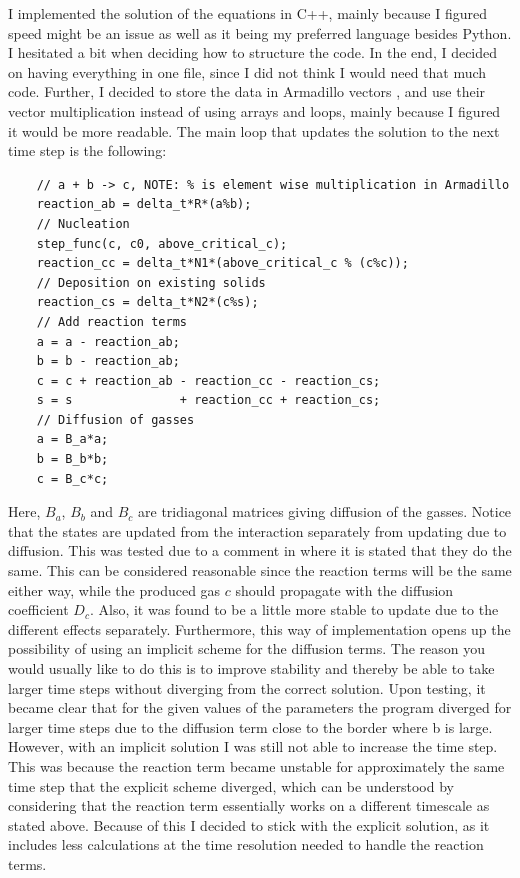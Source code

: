 \documentclass[1p]{elsarticle}        	%
\begin{document}
I implemented the solution of the equations in C++, mainly because I figured speed might be an issue as well as it being my preferred language besides Python. 
I hesitated a bit when deciding how to structure the code. In the end, I decided on having everything in one file, since I did not think I would need that much code. 
Further, I decided to store the data in Armadillo vectors  \cite{armadillo}, and use their vector multiplication instead of using arrays and loops, mainly because I figured it would be more readable. 
The main loop that updates the solution to the next time step is the following:
\begin{lstlisting}
    // a + b -> c, NOTE: % is element wise multiplication in Armadillo
    reaction_ab = delta_t*R*(a%b);
    // Nucleation
    step_func(c, c0, above_critical_c);
    reaction_cc = delta_t*N1*(above_critical_c % (c%c));
    // Deposition on existing solids
    reaction_cs = delta_t*N2*(c%s);
    // Add reaction terms
    a = a - reaction_ab;
    b = b - reaction_ab;
    c = c + reaction_ab - reaction_cc - reaction_cs;
    s = s               + reaction_cc + reaction_cs;
    // Diffusion of gasses
    a = B_a*a;
    b = B_b*b;
    c = B_c*c;
\end{lstlisting}
Here, $B_a$, $B_b$ and $B_c$ are tridiagonal matrices giving diffusion of the gasses. Notice that the states are updated from the interaction separately from updating due to diffusion.
This was tested due to a comment in \cite{einarsrud} where it is stated that they do the same.
This can be considered reasonable since the reaction terms will be the same either way, while the produced gas $c$ should propagate with the diffusion coefficient $D_c$.
Also, it was found to be a little more stable to update due to the different effects separately.
Furthermore, this way of implementation opens up the possibility of using an implicit scheme for the diffusion terms.
The reason you would usually like to do this is to improve stability and thereby be able to take larger time steps without diverging from the correct solution.
Upon testing, it became clear that for the given values of the parameters the program diverged for larger time steps due to the diffusion term close to the border where b is large.
However, with an implicit solution I was still not able to increase the time step.
This was because the reaction term became unstable for approximately the same time step that the explicit scheme diverged, which can be understood by considering that the reaction term essentially works on a different timescale as stated above.
Because of this I decided to stick with the explicit solution, as it includes less calculations at the time resolution needed to handle the reaction terms.
\end{document}
